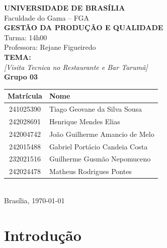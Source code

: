 \documentclass[12pt, a4paper]{article}
\begin{document}
\begin{titlepage}
  \centering

  {\large \textbf{UNIVERSIDADE DE BRASÍLIA}}\\[0.3cm]
  {\large Faculdade do Gama – FGA}\\[2cm]

  {\Large \textbf{GESTÃO DA PRODUÇÃO E QUALIDADE}}\\[0.5cm]
  {\large Turma: 14h00}\\[0.3cm]
  {\large Professora: Rejane Figueiredo}\\[2cm]

  {\LARGE \textbf{TEMA:}}\\[0.5cm]
  {\Large \textit{[Visita Tecnica no Restaurante e Bar Tarumã]}}\\[2cm]

  {\large \textbf{Grupo 03}}\\[1cm]

  \begin{tabular}{cl}
    \toprule
    \textbf{Matrícula} & \textbf{Nome} \\
    \midrule
    241025390 & Tiago Geovane da Silva Sousa \\
    242028691 & Henrique Mendes Elias \\
    242004742 & João Guilherme Amancio de Melo \\
    242015488 & Gabriel Portácio Candeia Costa \\
    232021516 & Guilherme Gusmão Nepomuceno \\
    242024478 & Matheus Rodrigues Pontes \\
    \bottomrule
  \end{tabular}\\[2cm]

  {\large Brasília, \today}

\end{titlepage}

\tableofcontents
\newpage

\section{Introdução}
\end{document}
